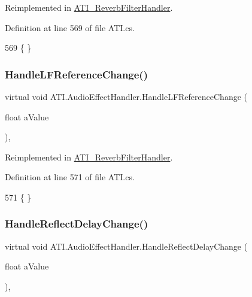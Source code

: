 Reimplemented in \hyperlink{class_a_t_i___reverb_filter_handler_a4cb8ab454ef637beb189053a0877c8c6}{A\+T\+I\+\_\+\+Reverb\+Filter\+Handler}.



Definition at line 569 of file A\+T\+I.\+cs.


\begin{DoxyCode}
569 \{ \}
\end{DoxyCode}
\mbox{\label{class_a_t_i_1_1_audio_effect_handler_a8414b47429880ba18133571c86cf14ab}} 
\subsubsection{\texorpdfstring{Handle\+L\+F\+Reference\+Change()}{HandleLFReferenceChange()}}
{\footnotesize\ttfamily virtual void A\+T\+I.\+Audio\+Effect\+Handler.\+Handle\+L\+F\+Reference\+Change (\begin{DoxyParamCaption}\item[{float}]{a\+Value }\end{DoxyParamCaption})\hspace{0.3cm}{\ttfamily [protected]}, {\ttfamily [virtual]}}



Reimplemented in \hyperlink{class_a_t_i___reverb_filter_handler_abf697e814be89c3bd354deaccb237746}{A\+T\+I\+\_\+\+Reverb\+Filter\+Handler}.



Definition at line 571 of file A\+T\+I.\+cs.


\begin{DoxyCode}
571 \{ \}
\end{DoxyCode}
\mbox{\label{class_a_t_i_1_1_audio_effect_handler_ada336ed04fdb3360de3026ba8659c409}} 
\subsubsection{\texorpdfstring{Handle\+Reflect\+Delay\+Change()}{HandleReflectDelayChange()}}
{\footnotesize\ttfamily virtual void A\+T\+I.\+Audio\+Effect\+Handler.\+Handle\+Reflect\+Delay\+Change (\begin{DoxyParamCaption}\item[{float}]{a\+Value }\end{DoxyParamCaption})\hspace{0.3cm}{\ttfamily [protected]}, {\ttfamily [virtual]}}



